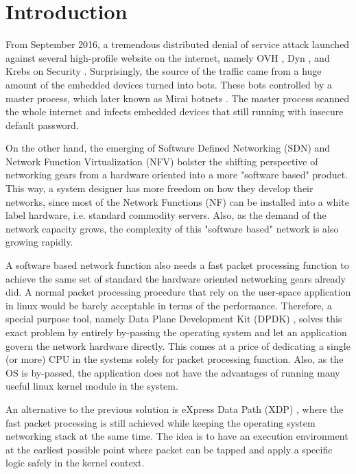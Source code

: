 \documentclass[sigplan,screen]{acmart}
\begin{document}
\maketitle

\section{Introduction}
From September 2016, a tremendous distributed denial of service attack launched against several high-profile website on the internet, namely OVH \cite{ovh}, Dyn \cite{dyn}, and Krebs on Security \cite{kos}. Surprisingly, the source of the traffic came from a huge amount of the embedded devices turned into bots. These bots controlled by a master process, which later known as Mirai botnets \cite{203628}. The master process scanned the whole internet and infects embedded devices that still running with insecure default password. 

On the other hand, the emerging of Software Defined Networking (SDN) and Network Function Virtualization (NFV) bolster the shifting perspective of networking gears from a hardware oriented into a more "software based" product. This way, a system designer has more freedom on how they develop their networks, since most of the Network Functions (NF) can be installed into a white label hardware, i.e. standard commodity servers. Also, as the demand of the network capacity grows, the complexity of this "software based" network is also growing rapidly.

A software based network function also needs a fast packet processing function to achieve the same set of standard the hardware oriented networking gears already did. A normal packet processing procedure that rely on the user-space application in linux would be barely acceptable in terms of the performance. Therefore, a special purpose tool, namely Data Plane Development Kit (DPDK) \citep{dpdk}, solves this exact problem by entirely by-passing the operating system and let an application govern the network hardware directly. This comes at a price of dedicating a single (or more) CPU in the systems solely for packet processing function. Also, as the OS is by-passed, the application does not have the advantages of running many useful linux kernel module in the system.

An alternative to the previous solution is eXpress Data Path (XDP) \citep{10.1145/3281411.3281443}, where the fast packet processing is still achieved while keeping the operating system networking stack at the same time. The idea is to have an execution environment at the earliest possible point where packet can be tapped and apply a specific logic safely in the kernel context. 
\end{document}
